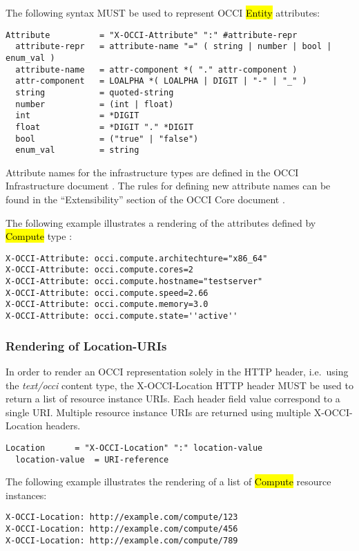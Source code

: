 \documentclass[10pt,a4paper]{article}
\begin{document}
The following syntax MUST be used to represent OCCI \hl{Entity}
attributes:

\begin{verbatim}
Attribute          = "X-OCCI-Attribute" ":" #attribute-repr
  attribute-repr   = attribute-name "=" ( string | number | bool | enum_val )
  attribute-name   = attr-component *( "." attr-component )
  attr-component   = LOALPHA *( LOALPHA | DIGIT | "-" | "_" )	
  string           = quoted-string
  number           = (int | float)
  int              = *DIGIT
  float            = *DIGIT "." *DIGIT
  bool             = ("true" | "false")
  enum_val         = string
\end{verbatim}

Attribute names for the infrastructure types are defined in the OCCI
Infrastructure document \cite{occi:infrastructure}.  The rules for
defining new attribute names can be found in the ``Extensibility''
section of the OCCI Core document \cite{occi:core}.

The following example illustrates a rendering of the attributes
defined by \hl{Compute} type \cite{occi:infrastructure}:

\begin{verbatim}
X-OCCI-Attribute: occi.compute.architechture="x86_64"
X-OCCI-Attribute: occi.compute.cores=2
X-OCCI-Attribute: occi.compute.hostname="testserver"
X-OCCI-Attribute: occi.compute.speed=2.66
X-OCCI-Attribute: occi.compute.memory=3.0
X-OCCI-Attribute: occi.compute.state=''active''
\end{verbatim}

\subsubsection{Rendering of Location-URIs}
In order to render an OCCI representation solely in the HTTP header,
i.e.~using the \textit{text/occi} content type, the X-OCCI-Location
HTTP header MUST be used to return a list of resource instance
URIs. Each header field value correspond to a single URI. Multiple
resource instance URIs are returned using multiple X-OCCI-Location
headers.

\begin{verbatim}
Location      = "X-OCCI-Location" ":" location-value
  location-value  = URI-reference
\end{verbatim}

The following example illustrates the rendering of a list of
\hl{Compute} resource instances:
\begin{verbatim}
X-OCCI-Location: http://example.com/compute/123
X-OCCI-Location: http://example.com/compute/456
X-OCCI-Location: http://example.com/compute/789
\end{verbatim}
\end{document}
